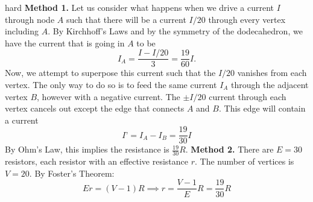 \begin{solution}{hard}
\textbf{Method 1.} Let us consider what happens when we drive a current $I$ through node $A$ such that there will be a current $I/20$ through every vertex including $A$. By Kirchhoff's Laws and by the symmetry of the dodecahedron, we have the current that is going in $A$ to be
\[I_A = \frac{I-I/20}{3} = \frac{19}{60}I.\]Now, we attempt to superpose this current such that the $I/20$ vanishes from each vertex. The only way to do so is to feed the same current $I_A$ through the adjacent vertex $B$, however with a negative current. The $\pm I/20$ current through each vertex cancels out except the edge that connects $A$ and $B$. This edge will contain a current
\[I’ = I_A - I_B = \frac{19}{30}I\]By Ohm’s Law, this implies the resistance is $\boxed{\frac{19}{30}R}$.
\tcbline
\textbf{Method 2.} There are $E=30$ resistors, each resistor with an effective resistance $r$. The number of vertices is $V=20$. By Foster's Theorem:
$$Er=(V-1)R \implies r = \frac{V-1}{E}R = \frac{19}{30}R$$
\end{solution}